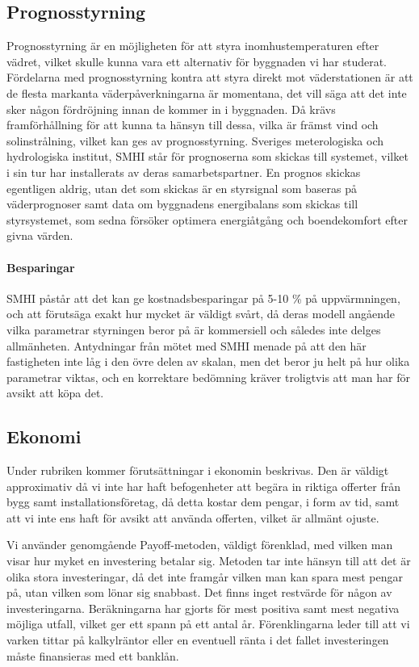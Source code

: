 \subsection{Prognosstyrning}
Prognosstyrning är en möjligheten för att styra inomhustemperaturen efter vädret, vilket skulle kunna vara ett alternativ för byggnaden vi har studerat.
Fördelarna med prognosstyrning kontra att styra direkt mot väderstationen är att de flesta markanta väderpåverkningarna är momentana, det vill säga att det inte sker någon fördröjning innan de kommer in i byggnaden. Då krävs framförhållning för att kunna ta hänsyn till dessa, vilka är främst vind och solinstrålning, vilket kan ges av prognosstyrning. Sveriges meterologiska och hydrologiska institut, SMHI står för prognoserna som skickas till systemet, vilket i sin tur har installerats av deras samarbetspartner. En prognos skickas egentligen aldrig, utan det som skickas är en styrsignal som baseras på väderprognoser samt data om byggnadens energibalans som skickas till styrsystemet, som sedna försöker optimera energiåtgång och boendekomfort efter givna värden.

\paragraph{Besparingar}
SMHI påstår att det kan ge kostnadsbesparingar på 5-10 \% på uppvärmningen, och att förutsäga exakt hur mycket är väldigt svårt, då deras modell angående vilka parametrar styrningen beror på är kommersiell och således inte delges allmänheten. Antydningar från mötet med SMHI menade på att den här fastigheten inte låg i den övre delen av skalan, men det beror ju helt på hur olika parametrar viktas, och en korrektare bedömning kräver troligtvis att man har för avsikt att köpa det.

\subsection{Ekonomi}
Under rubriken kommer förutsättningar i ekonomin beskrivas. Den är väldigt approximativ då vi inte har haft befogenheter att begära in riktiga offerter från bygg samt installationsföretag, då detta kostar dem pengar, i form av tid, samt att vi inte ens haft för avsikt att använda offerten, vilket är allmänt ojuste.

Vi använder genomgående Payoff-metoden, väldigt förenklad, med vilken man visar hur myket en investering betalar sig. Metoden tar inte hänsyn till att det är olika stora investeringar, då det inte framgår vilken man kan spara mest pengar på, utan vilken som lönar sig snabbast. Det finns inget restvärde för någon av investeringarna. Beräkningarna har gjorts för mest positiva samt mest negativa möjliga utfall, vilket ger ett spann på ett antal år. Förenklingarna leder till att vi varken tittar på kalkylräntor eller en eventuell ränta i det fallet investeringen måste finansieras med ett banklån.

